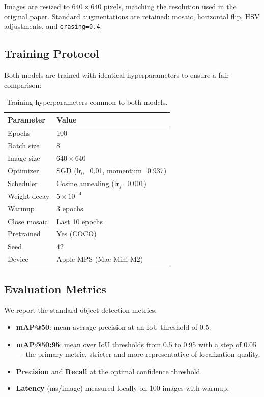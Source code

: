 \documentclass[11pt,a4paper]{article}
\begin{document}
Images are resized to $640\!\times\!640$ pixels, matching the resolution used in the original paper. Standard augmentations are retained: mosaic, horizontal flip, HSV adjustments, and \texttt{erasing=0.4}.

\subsection{Training Protocol}

Both models are trained with identical hyperparameters to ensure a fair comparison:

\begin{table}[H]
\centering
\caption{Training hyperparameters common to both models.}
\label{tab:hyperparams}
\begin{tabular}{ll}
\toprule
\textbf{Parameter} & \textbf{Value} \\
\midrule
Epochs               & 100 \\
Batch size           & 8 \\
Image size           & $640\!\times\!640$ \\
Optimizer            & SGD (lr$_0$=0.01, momentum=0.937) \\
Scheduler            & Cosine annealing (lr$_f$=0.001) \\
Weight decay         & $5\!\times\!10^{-4}$ \\
Warmup               & 3 epochs \\
Close mosaic         & Last 10 epochs \\
Pretrained           & Yes (COCO) \\
Seed                 & 42 \\
Device               & Apple MPS (Mac Mini M2) \\
\bottomrule
\end{tabular}
\end{table}

\subsection{Evaluation Metrics}

We report the standard object detection metrics:
\begin{itemize}[noitemsep]
  \item \textbf{mAP@50}: mean average precision at an IoU threshold of 0.5.
  \item \textbf{mAP@50:95}: mean over IoU thresholds from 0.5 to 0.95 with a step of 0.05 --- the primary metric, stricter and more representative of localization quality.
  \item \textbf{Precision} and \textbf{Recall} at the optimal confidence threshold.
  \item \textbf{Latency} (ms/image) measured locally on 100 images with warmup.
\end{itemize}
\end{document}
